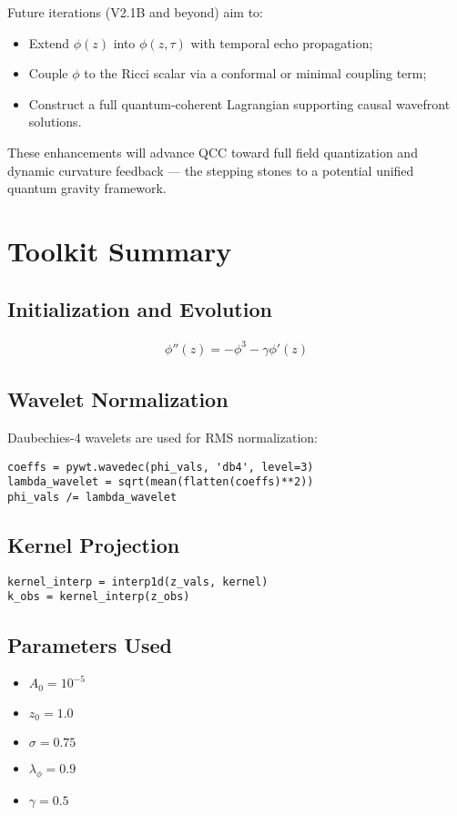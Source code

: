 \documentclass[12pt]{article}
\begin{document}
Future iterations (V2.1B and beyond) aim to:
\begin{itemize}
	\item Extend $\phi(z)$ into $\phi(z, \tau)$ with temporal echo propagation;
	\item Couple $\phi$ to the Ricci scalar via a conformal or minimal coupling term;
	\item Construct a full quantum-coherent Lagrangian supporting causal wavefront solutions.
\end{itemize}

These enhancements will advance QCC toward full field quantization and dynamic curvature feedback — the stepping stones to a potential unified quantum gravity framework.

\section{Toolkit Summary}
\subsection*{Initialization and Evolution}
\begin{align}
\phi''(z) = -\phi^3 - \gamma \phi'(z)
\end{align}

\subsection*{Wavelet Normalization}
Daubechies-4 wavelets are used for RMS normalization:
\begin{verbatim}
coeffs = pywt.wavedec(phi_vals, 'db4', level=3)
lambda_wavelet = sqrt(mean(flatten(coeffs)**2))
phi_vals /= lambda_wavelet
\end{verbatim}

\subsection*{Kernel Projection}
\begin{verbatim}
kernel_interp = interp1d(z_vals, kernel)
k_obs = kernel_interp(z_obs)
\end{verbatim}

\subsection*{Parameters Used}
\begin{itemize}
  \item \( A_0 = 10^{-5} \)
  \item \( z_0 = 1.0 \)
  \item \( \sigma = 0.75 \)
  \item \( \lambda_\phi = 0.9 \)
  \item \( \gamma = 0.5 \)
\end{itemize}
\end{document}
